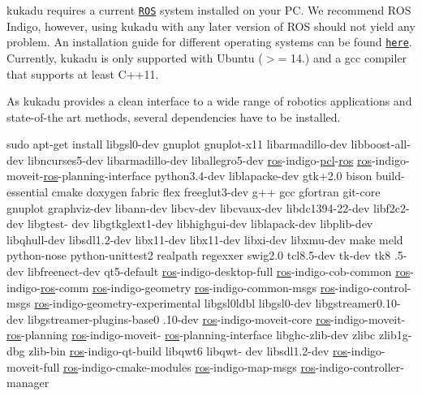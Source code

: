kukadu requires a current \href{http://www.ros.org/}{\tt R\+OS} system installed on your PC. We recommend R\+OS Indigo, however, using kukadu with any later version of R\+OS should not yield any problem. An installation guide for different operating systems can be found \href{http://wiki.ros.org/indigo/Installation}{\tt here}. Currently, kukadu is only supported with Ubuntu ($>$= 14.) and a gcc compiler that supports at least C++11.

As kukadu provides a clean interface to a wide range of robotics applications and state-\/of-\/the art methods, several dependencies have to be installed.


\begin{DoxyCode}
sudo apt-\textcolor{keyword}{get} install libgsl0-dev gnuplot gnuplot-x11 libarmadillo-dev libboost-all-dev libncurses5-dev 
      libarmadillo-dev liballegro5-dev \hyperlink{namespaceros}{ros}-indigo-\hyperlink{namespacepcl}{pcl}-\hyperlink{namespaceros}{ros} \hyperlink{namespaceros}{ros}-indigo-moveit-\hyperlink{namespaceros}{ros}-planning-\textcolor{keyword}{interface }
      python3.4-dev liblapacke-dev gtk+2.0 bison build-essential cmake doxygen fabric flex freeglut3-dev g++ gcc 
      gfortran git-core gnuplot graphviz-dev libann-dev libcv-dev libcvaux-dev libdc1394-22-dev libf2c2-dev libgtest-
      dev libgtkglext1-dev libhighgui-dev liblapack-dev libplib-dev libqhull-dev libsdl1.2-dev libx11-dev libx11-dev
       libxi-dev libxmu-dev make meld python-nose python-unittest2 realpath regexxer swig2.0 tcl8.5-dev tk-dev tk8
      .5-dev libfreenect-dev qt5-default \hyperlink{namespaceros}{ros}-indigo-desktop-full \hyperlink{namespaceros}{ros}-indigo-cob-common 
      \hyperlink{namespaceros}{ros}-indigo-\hyperlink{namespaceros}{ros}-comm \hyperlink{namespaceros}{ros}-indigo-geometry \hyperlink{namespaceros}{ros}-indigo-common-msgs \hyperlink{namespaceros}{ros}-indigo-control-msgs 
      \hyperlink{namespaceros}{ros}-indigo-geometry-experimental libgsl0ldbl libgsl0-dev libgstreamer0.10-dev libgstreamer-plugins-base0
      .10-dev \hyperlink{namespaceros}{ros}-indigo-moveit-core \hyperlink{namespaceros}{ros}-indigo-moveit-\hyperlink{namespaceros}{ros}-planning \hyperlink{namespaceros}{ros}-indigo-moveit-
      \hyperlink{namespaceros}{ros}-planning-interface libghc-zlib-dev zlibc zlib1g-dbg zlib-bin \hyperlink{namespaceros}{ros}-indigo-qt-build libqwt6 libqwt-
      dev libsdl1.2-dev \hyperlink{namespaceros}{ros}-indigo-moveit-full \hyperlink{namespaceros}{ros}-indigo-cmake-modules \hyperlink{namespaceros}{ros}-indigo-map-msgs 
      \hyperlink{namespaceros}{ros}-indigo-controller-manager
\end{DoxyCode}


